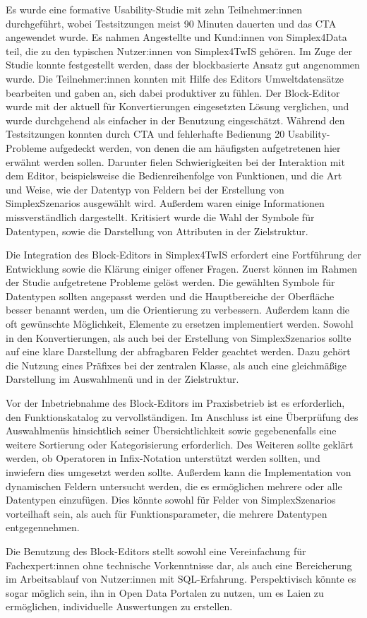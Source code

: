 \pskip
Es wurde eine formative Usability-Studie mit zehn Teilnehmer:innen durchgeführt, wobei Testsitzungen meist 90 Minuten dauerten und das \acf{CTA} angewendet wurde. Es nahmen Angestellte und Kund:innen von Simplex4Data teil, die zu den typischen Nutzer:innen von Simplex4TwIS gehören. Im Zuge der Studie konnte festgestellt werden, dass der blockbasierte Ansatz gut angenommen wurde. Die Teilnehmer:innen konnten mit Hilfe des Editors Umweltdatensätze bearbeiten und gaben an, sich dabei produktiver zu fühlen. Der Block-Editor wurde mit der aktuell für Konvertierungen eingesetzten Lösung verglichen, und wurde durchgehend als einfacher in der Benutzung eingeschätzt. Während den Testsitzungen konnten durch \ac{CTA} und fehlerhafte Bedienung 20 Usability-Probleme aufgedeckt werden, von denen die am häufigsten aufgetretenen hier erwähnt werden sollen. Darunter fielen Schwierigkeiten bei der Interaktion mit dem Editor, beispielsweise die Bedienreihenfolge von Funktionen, und die Art und Weise, wie der Datentyp von Feldern bei der Erstellung von SimplexSzenarios ausgewählt wird. Außerdem waren einige Informationen missverständlich dargestellt. Kritisiert wurde die Wahl der Symbole für Datentypen, sowie die Darstellung von Attributen in der Zielstruktur.

\pskip
Die Integration des Block-Editors in Simplex4TwIS erfordert eine Fortführung der Entwicklung sowie die Klärung einiger offener Fragen. Zuerst können im Rahmen der Studie aufgetretene Probleme gelöst werden. Die gewählten Symbole für Datentypen sollten angepasst werden und die Hauptbereiche der Oberfläche besser benannt werden, um die Orientierung zu verbessern. Außerdem kann die oft gewünschte Möglichkeit, Elemente zu ersetzen implementiert werden. Sowohl in den Konvertierungen, als auch bei der Erstellung von SimplexSzenarios sollte auf eine klare Darstellung der abfragbaren Felder geachtet werden. Dazu gehört die Nutzung eines Präfixes bei der zentralen Klasse, als auch eine gleichmäßige Darstellung im Auswahlmenü und in der Zielstruktur.

Vor der Inbetriebnahme des Block-Editors im Praxisbetrieb ist es erforderlich, den Funktionskatalog zu vervollständigen. Im Anschluss ist eine Überprüfung des Auswahlmenüs hinsichtlich seiner Übersichtlichkeit sowie gegebenenfalls eine weitere Sortierung oder Kategorisierung erforderlich. Des Weiteren sollte geklärt werden, ob Operatoren in Infix-Notation unterstützt werden sollten, und inwiefern dies umgesetzt werden sollte. Außerdem kann die Implementation von dynamischen Feldern untersucht werden, die es ermöglichen mehrere oder alle Datentypen einzufügen. Dies könnte sowohl für Felder von SimplexSzenarios vorteilhaft sein, als auch für Funktionsparameter, die mehrere Datentypen entgegennehmen.

\pskip
Die Benutzung des Block-Editors stellt sowohl eine Vereinfachung für Fachexpert:innen ohne technische Vorkenntnisse dar, als auch eine Bereicherung im Arbeitsablauf von Nutzer:innen mit \ac{SQL}-Erfahrung. Perspektivisch könnte es sogar möglich sein, ihn in Open Data Portalen zu nutzen, um es Laien zu ermöglichen, individuelle Auswertungen zu erstellen.
